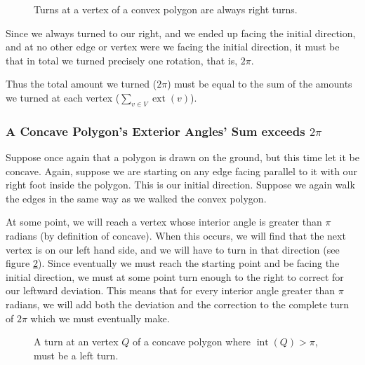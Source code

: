 \documentclass{article}
\newcommand{\inta}[1]{\operatorname{int}\left( #1 \right)} %
\newcommand{\exta}[1]{\operatorname{ext}\left( #1 \right)} %
\begin{document}
\begin{figure}[htbp]
	\centering
	\caption{Turns at a vertex of a convex polygon are always right turns.}
	\label{walk-1}
\end{figure}

Since we always turned to our right, and we ended up facing the initial direction, and at no other edge or vertex were we facing the initial direction, it must be that in total we turned precisely one rotation, that is, \(2\pi\).

Thus the total amount we turned (\(2\pi\)) must be equal to the sum of the amounts we turned at each vertex (\(\sum_{v \in V}\exta{v}\)).

\subsubsection{A Concave Polygon's Exterior Angles' Sum exceeds \(2\pi\)}

Suppose once again that a polygon is drawn on the ground, but this time let it be concave. Again, suppose we are starting on any edge facing parallel to it with our right foot inside the polygon. This is our initial direction. Suppose we again walk the edges in the same way as we walked the convex polygon.

At some point, we will reach a vertex whose interior angle is greater than \(\pi\) radians (by definition of concave). When this occurs, we will find that the next vertex is on our left hand side, and we will have to turn in that direction (see figure \ref{walk-2}). Since eventually we must reach the starting point and be facing the initial direction, we must at some point turn enough to the right to correct for our leftward deviation. This means that for every interior angle greater than \(\pi\) radians, we will add both the deviation and the correction to the complete turn of \(2\pi\) which we must eventually make.

\begin{figure}
	\centering
	\caption{A turn at an vertex \(Q\) of a concave polygon where \(\inta{Q} > \pi\), must be a left turn.}
	\label{walk-2}
\end{figure}%
\end{document}
